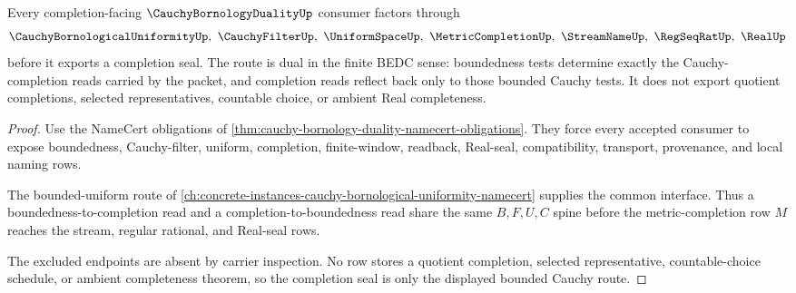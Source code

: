 \begin{theorem}
\label{thm:cauchy-bornology-duality-completion-route}
Every completion-facing $\CauchyBornologyDualityUp$ consumer factors through
$$
\CauchyBornologicalUniformityUp,\ \CauchyFilterUp,\ \UniformSpaceUp,\ \MetricCompletionUp,\ \StreamNameUp,\ \RegSeqRatUp,\ \RealUp
$$
before it exports a completion seal. The route is dual in the finite BEDC sense: boundedness tests determine exactly the Cauchy-completion reads carried by the packet, and completion reads reflect back only to those bounded Cauchy tests. It does not export quotient completions, selected representatives, countable choice, or ambient Real completeness.
\end{theorem}
\begin{proof}
Use the NameCert obligations of \autoref{thm:cauchy-bornology-duality-namecert-obligations}. They force every accepted consumer to expose boundedness, Cauchy-filter, uniform, completion, finite-window, readback, Real-seal, compatibility, transport, provenance, and local naming rows.

The bounded-uniform route of \autoref{ch:concrete-instances-cauchy-bornological-uniformity-namecert} supplies the common interface. Thus a boundedness-to-completion read and a completion-to-boundedness read share the same $B,F,U,C$ spine before the metric-completion row $M$ reaches the stream, regular rational, and Real-seal rows.

The excluded endpoints are absent by carrier inspection. No row stores a quotient completion, selected representative, countable-choice schedule, or ambient completeness theorem, so the completion seal is only the displayed bounded Cauchy route.
\end{proof}



